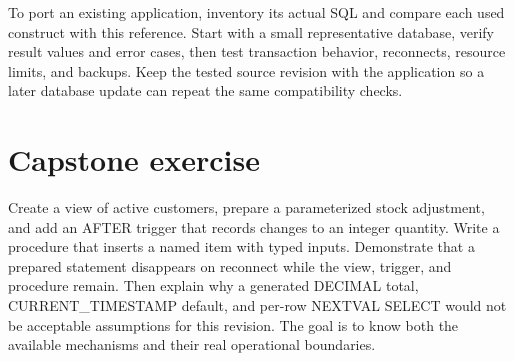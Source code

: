 To port an existing application, inventory its actual SQL and compare each used construct with this reference. Start with a small representative database, verify result values and error cases, then test transaction behavior, reconnects, resource limits, and backups. Keep the tested source revision with the application so a later database update can repeat the same compatibility checks.

\section{Capstone exercise}

Create a view of active customers, prepare a parameterized stock adjustment, and add an AFTER trigger that records changes to an integer quantity. Write a procedure that inserts a named item with typed inputs. Demonstrate that a prepared statement disappears on reconnect while the view, trigger, and procedure remain. Then explain why a generated DECIMAL total, CURRENT\_TIMESTAMP default, and per-row NEXTVAL SELECT would not be acceptable assumptions for this revision. The goal is to know both the available mechanisms and their real operational boundaries.
